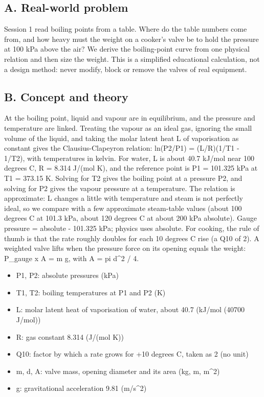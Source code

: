 \documentclass[11pt,a4paper]{article}
\begin{document}
\subsection*{A. Real-world problem}
Session 1 read boiling points from a table. Where do the table numbers come from, and how heavy must the weight on a cooker's valve be to hold the pressure at 100 kPa above the air? We derive the boiling-point curve from one physical relation and then size the weight. This is a simplified educational calculation, not a design method: never modify, block or remove the valves of real equipment.

\subsection*{B. Concept and theory}
At the boiling point, liquid and vapour are in equilibrium, and the pressure and temperature are linked. Treating the vapour as an ideal gas, ignoring the small volume of the liquid, and taking the molar latent heat L of vaporisation as constant gives the Clausius-Clapeyron relation: ln(P2/P1) = (L/R)(1/T1 - 1/T2), with temperatures in kelvin. For water, L is about 40.7 kJ/mol near 100 degrees C, R = 8.314 J/(mol K), and the reference point is P1 = 101.325 kPa at T1 = 373.15 K. Solving for T2 gives the boiling point at a pressure P2, and solving for P2 gives the vapour pressure at a temperature. The relation is approximate: L changes a little with temperature and steam is not perfectly ideal, so we compare with a few approximate steam-table values (about 100 degrees C at 101.3 kPa, about 120 degrees C at about 200 kPa absolute). Gauge pressure = absolute - 101.325 kPa; physics uses absolute. For cooking, the rule of thumb is that the rate roughly doubles for each 10 degrees C rise (a Q10 of 2). A weighted valve lifts when the pressure force on its opening equals the weight: P\_gauge x A = m g, with A = pi d\textasciicircum{}2 / 4.

\begin{itemize}[nosep]
\item P1, P2: absolute pressures (kPa)
\item T1, T2: boiling temperatures at P1 and P2 (K)
\item L: molar latent heat of vaporisation of water, about 40.7 (kJ/mol (40700 J/mol))
\item R: gas constant 8.314 (J/(mol K))
\item Q10: factor by which a rate grows for +10 degrees C, taken as 2 (no unit)
\item m, d, A: valve mass, opening diameter and its area (kg, m, m\textasciicircum{}2)
\item g: gravitational acceleration 9.81 (m/s\textasciicircum{}2)
\end{itemize}
\end{document}

